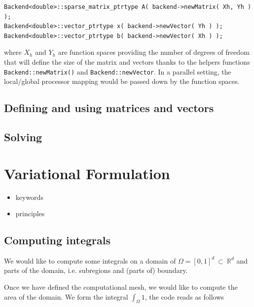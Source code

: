 \documentclass[a4paper]{book}
\begin{document}
\begin{lstlisting}
Backend<double>::sparse_matrix_ptrtype A( backend->newMatrix( Xh, Yh ) );
Backend<double>::vector_ptrtype x( backend->newVector( Yh ) );
Backend<double>::vector_ptrtype b( backend->newVector( Xh ) );
\end{lstlisting}
\noindent
where $X_h$ and $Y_h$ are function spaces providing the number of
degrees of freedom that will define the size of the matrix and vectors
thanks to the helpers functions \lstinline!Backend::newMatrix()! and
\lstinline!Backend::newVector!. In a parallel setting, the
local/global processor mapping would be passed down by the function
spaces.

\subsection{Defining and using matrices and vectors}
\label{sec:defin-using-matr}

\subsection{Solving}
\label{sec:solving}


\section{Variational Formulation}
\label{sec:vari-form}

\begin{itemize}
\item keywords
\item principles
\end{itemize}

\subsection{Computing integrals}
\label{sec:computing-integrals}

We would like to compute some integrals on a domain of $\Omega=[0,1]^d\ \subset\ \mathbb{R}^d$
and parts of the domain, i.e. subregions and (parts of) boundary.

Once we have defined the computational mesh, we would like to compute
the area of the domain. We form the integral $\int_\Omega 1$, the code
reads as follows


\end{document}
